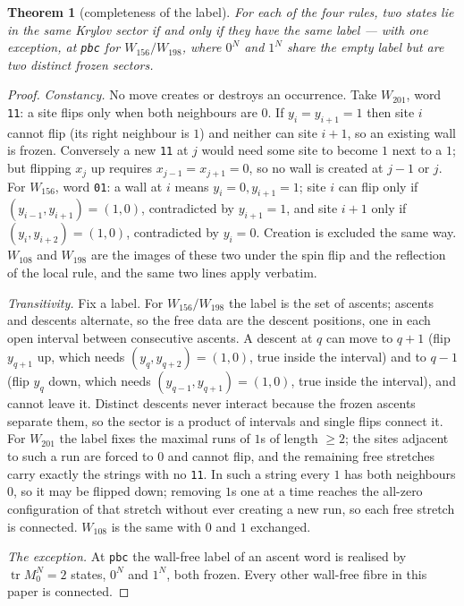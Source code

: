 \documentclass[11pt]{article}
\newcommand{\rt}[1]{\texttt{#1}}
\theoremstyle{plain}
\newtheorem{theorem}{Theorem}
\theoremstyle{remark}
\begin{document}
\begin{theorem}[completeness of the label]
\label{thm:label}
For each of the four rules, two states lie in the same Krylov sector if and only
if they have the same label --- with one exception, at \rt{pbc} for
$W_{156}/W_{198}$, where $0^N$ and $1^N$ share the empty label but are two
distinct frozen sectors.
\end{theorem}

\begin{proof}[Proof]
\emph{Constancy.} No move creates or destroys an occurrence. Take $W_{201}$,
word \rt{11}: a site flips only when both neighbours are $0$. If $y_i=y_{i+1}=1$
then site $i$ cannot flip (its right neighbour is $1$) and neither can site
$i+1$, so an existing wall is frozen. Conversely a new \rt{11} at $j$ would need
some site to become $1$ next to a $1$; but flipping $x_j$ up requires
$x_{j-1}=x_{j+1}=0$, so no wall is created at $j-1$ or $j$. For $W_{156}$, word
\rt{01}: a wall at $i$ means $y_i=0,y_{i+1}=1$; site $i$ can flip only if
$(y_{i-1},y_{i+1})=(1,0)$, contradicted by $y_{i+1}=1$, and site $i+1$ only if
$(y_i,y_{i+2})=(1,0)$, contradicted by $y_i=0$. Creation is excluded the same
way. $W_{108}$ and $W_{198}$ are the images of these two under the spin flip and
the reflection of the local rule, and the same two lines apply verbatim.

\emph{Transitivity.} Fix a label. For $W_{156}/W_{198}$ the label is the set of
ascents; ascents and descents alternate, so the free data are the descent
positions, one in each open interval between consecutive ascents. A descent at
$q$ can move to $q+1$ (flip $y_{q+1}$ up, which needs $(y_q,y_{q+2})=(1,0)$, true
inside the interval) and to $q-1$ (flip $y_q$ down, which needs
$(y_{q-1},y_{q+1})=(1,0)$, true inside the interval), and cannot leave it.
Distinct descents never interact because the frozen ascents separate them, so the
sector is a product of intervals and single flips connect it.
For $W_{201}$ the label fixes the maximal runs of $1$s of length $\ge 2$; the
sites adjacent to such a run are forced to $0$ and cannot flip, and the remaining
free stretches carry exactly the strings with no \rt{11}. In such a string every
$1$ has both neighbours $0$, so it may be flipped down; removing $1$s one at a
time reaches the all-zero configuration of that stretch without ever creating a
new run, so each free stretch is connected. $W_{108}$ is the same with $0$ and
$1$ exchanged.

\emph{The exception.} At \rt{pbc} the wall-free label of an ascent word is
realised by $\operatorname{tr}M_0^N=2$ states, $0^N$ and $1^N$, both frozen. Every
other wall-free fibre in this paper is connected.
\end{proof}
\end{document}
